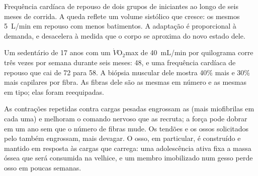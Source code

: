 \begin{omfigure}

{\small Frequência cardíaca de repouso de dois grupos de iniciantes ao
longo de seis meses de corrida. A queda reflete um volume sistólico que
cresce: os mesmos \qty{5}{L/min} em repouso com menos batimentos. A
adaptação é proporcional à demanda, e desacelera à medida que o corpo
se aproxima do novo estado dele.}
\end{omfigure}

\begin{example}\label{ex:g10:sport-and-health:numbers}
Um sedentário de 17 anos com um $\dot V\!\mathrm{O_2}$max de
\qty{40}{mL/min} por quilograma corre três vezes por semana durante
seis meses: \num{48}, e uma frequência cardíaca de repouso que cai de
72 para 58. A biópsia muscular dele mostra 40\% mais  e
30\% mais capilares por fibra. As fibras dele são as mesmas em número e
as mesmas em tipo; elas foram reequipadas.
\end{example}

\begin{proposition}\label{prop:g10:sport-and-health:strength}
As contrações repetidas contra cargas pesadas engrossam as  (mais miofibrilas em cada uma) e melhoram o comando nervoso
que as recruta; a força pode dobrar em um ano sem que o número de
fibras mude. Os tendões e os ossos solicitados pelo  também
engrossam, mais devagar. O osso, em particular, é construído e mantido
em resposta às cargas que carrega: uma adolescência ativa fixa a massa
óssea que será consumida na velhice, e um membro imobilizado num gesso
perde osso em poucas semanas.
\end{proposition}
\admitted


